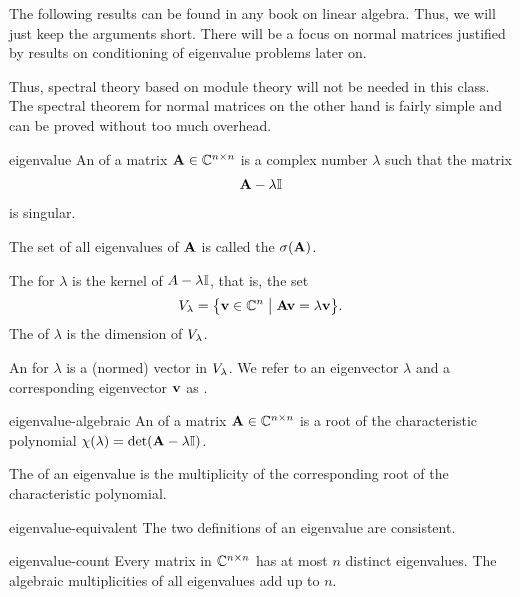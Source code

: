 \begin{intro}
  The following results can be found in any book on linear
  algebra. Thus, we will just keep the arguments short. There will be a
  focus on normal matrices justified by results on conditioning of
  eigenvalue problems later on.

  Thus, spectral theory based on module theory will not be needed in
  this class. The spectral theorem for normal matrices on the other
  hand is fairly simple and can be proved without too much overhead.
\end{intro}

\begin{Definition}{eigenvalue}
  An  of a matrix $\mathbf A\in \mathbb C^{n\times n}$ is a
  complex number $\lambda$ such that the matrix
  \begin{gather}
   \mathbf A-\lambda\mathbb I
  \end{gather}
  is singular.

  The set of all eigenvalues of $\mathbf A$ is called the
   $\sigma(\mathbf A)$.

  The  for $\lambda$ is the kernel of
  $A-\lambda\mathbb I$, that is, the set
\begin{gather}
    V_{\lambda} = \bigl\{
    \mathbf v \in \mathbb C^n \;\big\vert\;
    \mathbf A\mathbf v = \lambda\mathbf v \bigr\}.
\end{gather}
The  of $\lambda$ is the dimension of
$V_{\lambda}$.


An  for $\lambda$ is a (normed) vector in
$V_{\lambda}$. We refer to an eigenvector $\lambda$ and a
corresponding eigenvector $\mathbf v$ as .
\end{Definition}

\begin{Definition}{eigenvalue-algebraic}
  An  of a matrix $\mathbf A\in \mathbb C^{n\times n}$ is a root of the characteristic polynomial $\chi(\lambda) = \det(\mathbf A-\lambda\mathbb I)$.

  The  of an eigenvalue is the multiplicity of the corresponding root of the characteristic polynomial.
\end{Definition}

\begin{Lemma}{eigenvalue-equivalent}
  The two definitions of an eigenvalue are consistent.
\end{Lemma}

\begin{Theorem}{eigenvalue-count}
  Every matrix in $\mathbb C^{n\times n}$ has at most $n$ distinct eigenvalues. The algebraic multiplicities of all eigenvalues add up to $n$.
\end{Theorem}


